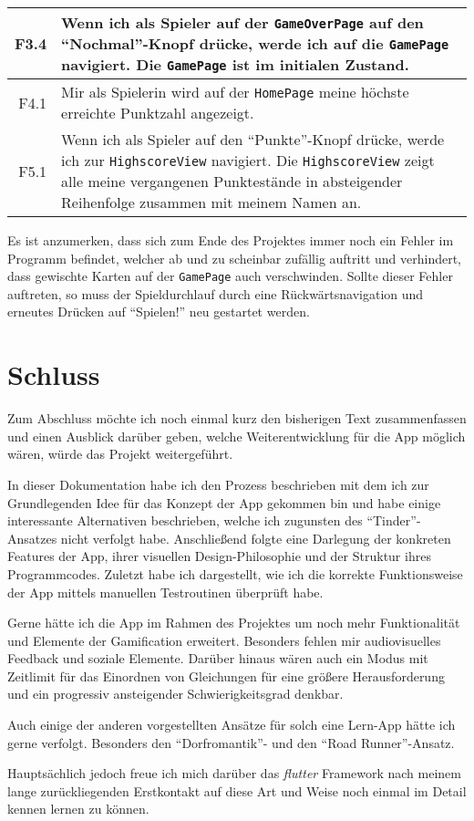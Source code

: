 \begin{longtabu}{| >{\ttfamily} r | X |}
  \hline
  F3.4 & Wenn ich als Spieler auf der \texttt{GameOverPage} auf den \enquote{Nochmal}-Knopf drücke, werde ich auf die \texttt{GamePage} navigiert. Die \texttt{GamePage} ist im initialen Zustand.\\
  \hline
  F4.1 & Mir als Spielerin wird auf der \texttt{HomePage} meine höchste erreichte Punktzahl angezeigt.\\
  \hline
  F5.1 & Wenn ich als Spieler auf den \enquote{Punkte}-Knopf drücke, werde ich zur \texttt{HighscoreView} navigiert. Die \texttt{HighscoreView} zeigt alle meine vergangenen Punktestände in absteigender Reihenfolge zusammen mit meinem Namen an.\\
  \hline
\end{longtabu}

Es ist anzumerken, dass sich zum Ende des Projektes immer noch ein Fehler im Programm befindet, welcher ab und zu scheinbar zufällig auftritt und verhindert, dass gewischte Karten auf der \texttt{GamePage} auch verschwinden.
Sollte dieser Fehler auftreten, so muss der Spieldurchlauf durch eine Rückwärtsnavigation und erneutes Drücken auf \enquote{Spielen!} neu gestartet werden.

\section{Schluss}

Zum Abschluss möchte ich noch einmal kurz den bisherigen Text zusammenfassen und einen Ausblick darüber geben, welche Weiterentwicklung für die App möglich wären, würde das Projekt weitergeführt.

In dieser Dokumentation habe ich den Prozess beschrieben mit dem ich zur Grundlegenden Idee für das Konzept der App gekommen bin und habe einige interessante Alternativen beschrieben, welche ich zugunsten des \enquote{Tinder}-Ansatzes nicht verfolgt habe.
Anschließend folgte eine Darlegung der konkreten Features der App, ihrer visuellen Design-Philosophie und der Struktur ihres Programmcodes.
Zuletzt habe ich dargestellt, wie ich die korrekte Funktionsweise der App mittels manuellen Testroutinen überprüft habe.

Gerne hätte ich die App im Rahmen des Projektes um noch mehr Funktionalität und Elemente der Gamification erweitert.
Besonders fehlen mir audiovisuelles Feedback und soziale Elemente.
Darüber hinaus wären auch ein Modus mit Zeitlimit für das Einordnen von Gleichungen für eine größere Herausforderung und ein progressiv ansteigender Schwierigkeitsgrad denkbar.

Auch einige der anderen vorgestellten Ansätze für solch eine Lern-App hätte ich gerne verfolgt.
Besonders den \enquote{Dorfromantik}- und den \enquote{Road Runner}-Ansatz.

Hauptsächlich jedoch freue ich mich darüber das \emph{flutter} Framework nach meinem lange zurückliegenden Erstkontakt auf diese Art und Weise noch einmal im Detail kennen lernen zu können.
